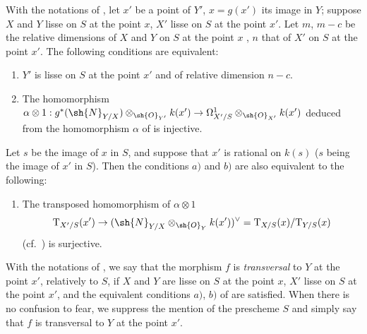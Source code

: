 \begin{proposition}[17.13.2]
\label{IV.17.13.2}
With the notations of , let $x'$ be a point of $Y'$, $x=g(x')$ its image in $Y$; suppose $X$ and $Y$ lisse on $S$ at the point $x$, $X'$ lisse on $S$ at the point $x'$.
Let $m$, $m-c$ be the relative dimensions of $X$ and $Y$ on $S$ at the point $x$ , $n$ that of $X'$ on $S$ at the point $x'$.
The following conditions are equivalent:
\begin{enumerate}
  \item[a)] $Y'$ is lisse on $S$ at the point $x'$ and of relative dimension $n-c$.
  \item[b)] The homomorphism $\alpha\otimes 1:g^*(\sh{N}_{Y/X})\otimes_{\sh{O}_{Y'}} k(x') \to \Omega^1_{X'/S}\otimes_{\sh{O}_{X'}} k(x')$ deduced from the homomorphism $\alpha$ of  is injective.
\end{enumerate}
Let $s$ be the image of $x$ in $S$, and suppose that $x'$ is rational on $k(s)$ ($s$ being the image of $x'$ in $S$).
Then the conditions $a)$ and $b)$ are also equivalent to the following:
\begin{enumerate}
  \item[b')] The transposed homomorphism of $\alpha\otimes 1$
\[
\mathrm{T}_{X'/S}(x') \to (\sh{N}_{Y/X}\otimes_{\sh{O}_Y} k(x'))^\vee = \mathrm{T}_{X/S}(x)/\mathrm{T}_{Y/S}(x)
\]
(cf.\ ) is surjective.
\end{enumerate}
\end{proposition}

\begin{definition}[17.13.3]
\label{IV.17.13.3}
With the notations of , we say that the morphism $f$ is \emph{transversal} to $Y$ at the point $x'$, relatively to $S$, if $X$ and $Y$ are lisse on $S$ at the point $x$, $X'$ lisse on $S$ at the point $x'$, and the equivalent conditions $a)$, $b)$ of  are satisfied.
When there is no confusion to fear, we suppress the mention of the prescheme $S$ and simply say that $f$ is transversal to $Y$ at the point $x'$.
\end{definition}

